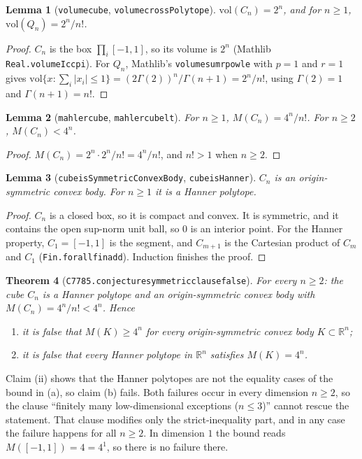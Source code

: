 \documentclass[11pt]{article}
\newtheorem{theorem}{Theorem}
\newtheorem{lemma}[theorem]{Lemma}
\theoremstyle{definition}
\theoremstyle{remark}
\renewcommand{\_}{\oldus\allowbreak}
\begin{document}
\begin{lemma}[\texttt{volume\_cube}, \texttt{volume\_crossPolytope}]
$\mathrm{vol}(C_n)=2^n$, and for $n\ge1$, $\mathrm{vol}(Q_n)=2^n/n!$.
\end{lemma}
\begin{proof}
$C_n$ is the box $\prod_i[-1,1]$, so its volume is $2^n$ (Mathlib \texttt{Real.volume\_Icc\_pi}).
For $Q_n$, Mathlib's \texttt{volume\_sum\_rpow\_le} with $p=1$ and $r=1$ gives
$\mathrm{vol}\{x:\sum_i|x_i|\le1\} = (2\Gamma(2))^n/\Gamma(n+1)=2^n/n!$, using $\Gamma(2)=1$ and
$\Gamma(n+1)=n!$.
\end{proof}

\begin{lemma}[\texttt{mahler\_cube}, \texttt{mahler\_cube\_lt}]
For $n\ge1$, $M(C_n)=4^n/n!$. For $n\ge2$, $M(C_n)<4^n$.
\end{lemma}
\begin{proof}
$M(C_n)=2^n\cdot 2^n/n!=4^n/n!$, and $n!>1$ when $n\ge2$.
\end{proof}

\begin{lemma}[\texttt{cube\_isSymmetricConvexBody}, \texttt{cube\_isHanner}]
$C_n$ is an origin-symmetric convex body. For $n\ge1$ it is a Hanner polytope.
\end{lemma}
\begin{proof}
$C_n$ is a closed box, so it is compact and convex. It is symmetric, and it contains the open
sup-norm unit ball, so $0$ is an interior point. For the Hanner property, $C_1=[-1,1]$ is the
segment, and $C_{m+1}$ is the Cartesian product of $C_m$ and $C_1$
(\texttt{Fin.forall\_fin\_add}). Induction finishes the proof.
\end{proof}

\begin{theorem}[\texttt{C7785.conjecture\_7785\_symmetric\_clause\_false}]
For every $n\ge2$: the cube $C_n$ is a Hanner polytope and an origin-symmetric convex body with
$M(C_n)=4^n/n!<4^n$. Hence
\begin{enumerate}[label=(\roman*)]
\item it is false that $M(K)\ge4^n$ for every origin-symmetric convex body $K\subset\mathbb{R}^n$;
\item it is false that every Hanner polytope in $\mathbb{R}^n$ satisfies $M(K)=4^n$.
\end{enumerate}
\end{theorem}

Claim (ii) shows that the Hanner polytopes are not the equality cases of the bound in (a), so claim (b) fails.
Both failures occur in every dimension $n\ge2$, so the clause ``finitely many low-dimensional
exceptions ($n\le3$)'' cannot rescue the statement. That clause modifies only the strict-inequality
part, and in any case the failure happens for all $n\ge 2$. In dimension $1$ the bound reads
$M([-1,1])=4=4^1$, so there is no failure there.
\end{document}
